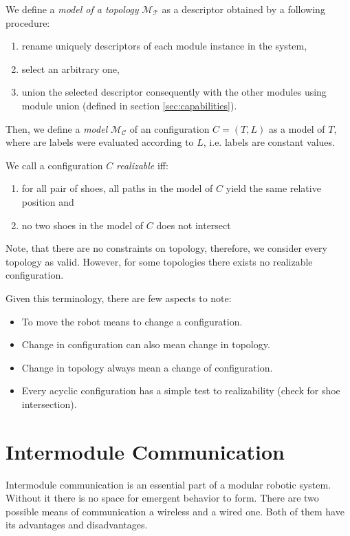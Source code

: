 We define a \emph{model of a topology} $\mathcal{M}_\mathcal{T}$ as a descriptor
obtained by a following procedure:
\begin{enumerate}
    \item rename uniquely descriptors of each module instance in the system,
    \item select an arbitrary one,
    \item union the selected descriptor consequently with the other modules
    using module union (defined in section \ref{sec:capabilities}).
\end{enumerate}
Then, we define a \emph{model} $\mathcal{M}_\mathcal{C}$ of an configuration
$C=(T, L)$ as a model of $T$, where are labels were evaluated according to $L$,
i.e. labels are constant values.

We call a configuration $C$ \emph{realizable} iff:
\begin{enumerate}
    \item for all pair of shoes, all paths in the model of $C$ yield the same
    relative position and
    \item no two shoes in the model of $C$ does not intersect
\end{enumerate}

Note, that there are no constraints on topology, therefore, we consider every
topology as valid. However, for some topologies there exists no realizable
configuration.

Given this terminology, there are few aspects to note:
\begin{itemize}
    \item To move the robot means to change a configuration.
    \item Change in configuration can also mean change in topology.
    \item Change in topology always mean a change of configuration.
    \item Every acyclic configuration has a simple test to realizability (check
    for shoe intersection).
\end{itemize}

\section{Intermodule Communication}\label{sec:communication}

Intermodule communication is an essential part of a modular robotic system.
Without it there is no space for emergent behavior to form. There are two
possible means of communication a wireless and a wired one. Both of them have
its advantages and disadvantages.

